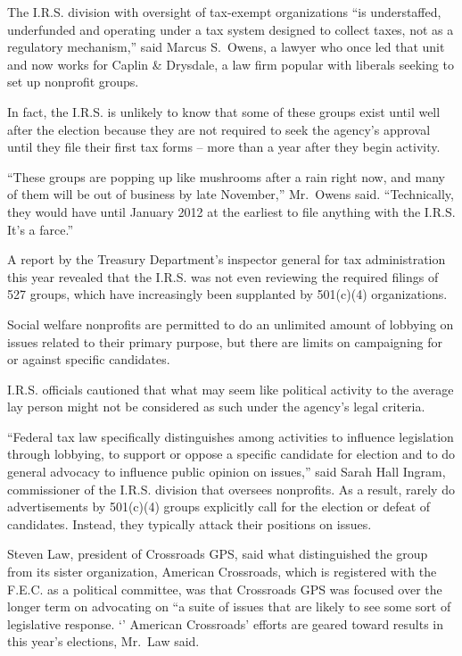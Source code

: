 ﻿\documentclass[12pt]{article}
\begin{document}
The I.R.S. division with oversight of tax-exempt organizations ``is understaffed, underfunded and
operating under a tax system designed to collect taxes, not as a regulatory mechanism,'' said Marcus
S.~Owens, a lawyer who once led that unit and now works for Caplin \& Drysdale, a law firm popular
with liberals seeking to set up nonprofit groups.

In fact, the I.R.S. is unlikely to know that some of these groups exist until well after the
election because they are not required to seek the agency's approval until they file their first tax
forms -- more than a year after they begin activity.

``These groups are popping up like mushrooms after a rain right now, and many of them will be out of
business by late November,'' Mr.~Owens said. ``Technically, they would have until January 2012 at
the earliest to file anything with the I.R.S. It's a farce.''

A report by the Treasury Department's inspector general for tax administration this year revealed
that the I.R.S. was not even reviewing the required filings of 527 groups, which have increasingly
been supplanted by 501(c)(4) organizations.

Social welfare nonprofits are permitted to do an unlimited amount of lobbying on issues related to
their primary purpose, but there are limits on campaigning for or against specific candidates.

I.R.S. officials cautioned that what may seem like political activity to the average lay person
might not be considered as such under the agency's legal criteria.

``Federal tax law specifically distinguishes among activities to influence legislation through
lobbying, to support or oppose a specific candidate for election and to do general advocacy to
influence public opinion on issues,'' said Sarah Hall Ingram, commissioner of the I.R.S. division
that oversees nonprofits. As a result, rarely do advertisements by 501(c)(4) groups explicitly call
for the election or defeat of candidates. Instead, they typically attack their positions on issues.

Steven Law, president of Crossroads GPS, said what distinguished the group from its sister
organization, American Crossroads, which is registered with the F.E.C. as a political committee, was
that Crossroads GPS was focused over the longer term on advocating on ``a suite of issues that are
likely to see some sort of legislative response. `' American Crossroads' efforts are geared toward
results in this year's elections, Mr.~Law said.
\end{document}
